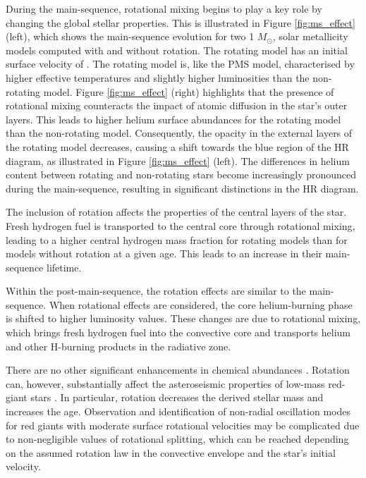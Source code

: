 During the main-sequence, rotational mixing begins to play a key role by changing the global stellar
properties. 
This is illustrated in Figure \ref{fig:ms_effect} (left), which shows the main-sequence evolution for two 1 $M_{\odot}$, solar metallicity models computed with and without rotation.
The rotating model has an initial surface velocity of .
The rotating model is, like the PMS model, characterised by higher effective temperatures and slightly higher luminosities than the non-rotating model.
Figure \ref{fig:ms_effect} (right) highlights that the presence of rotational mixing counteracts the impact of atomic diffusion in the star's outer layers. 
This leads to higher helium surface abundances for the rotating model than the non-rotating model.
Consequently, the opacity in the external layers of the rotating model decreases, causing a shift towards the blue region of the HR diagram, as illustrated in Figure \ref{fig:ms_effect} (left). 
The differences in helium content between rotating and non-rotating stars become increasingly pronounced during the main-sequence, resulting in significant distinctions in the HR diagram.

The inclusion of rotation affects the properties of the central layers of the star. 
Fresh hydrogen fuel is transported to the central core through rotational mixing, leading to a higher central hydrogen mass fraction for rotating models than for models without rotation at a given age. 
This leads to an increase in their main-sequence lifetime.

Within the post-main-sequence, the rotation effects are similar to the main-sequence.
When rotational effects are considered, the core helium-burning phase is shifted to higher luminosity values. 
These changes are due to rotational mixing, which brings fresh hydrogen fuel into the convective core and transports helium and other H-burning products in the radiative zone.

There are no other significant enhancements in chemical abundances \citep[see Table 2 in][]{lagarde_thermohaline_2012}.
Rotation can, however, substantially affect the asteroseismic properties of low-mass red-giant stars \citep{lagarde_thermohaline_2012, eggenberger_effects_2010}.
In particular, rotation decreases the derived stellar mass and increases the age.
Observation and identification of non-radial oscillation modes for red giants with moderate surface rotational velocities may be complicated due to non-negligible values of rotational splitting, which can be reached depending on the assumed rotation law in the convective envelope and the star's initial velocity.\\
 \\
 \\


